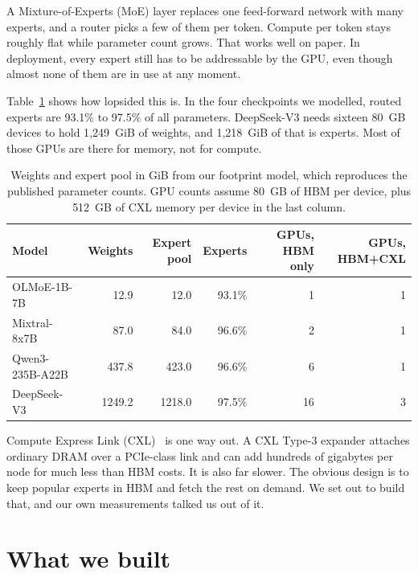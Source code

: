 \documentclass[10pt,a4paper]{article}
\begin{document}
A Mixture-of-Experts (MoE) layer replaces one feed-forward network with many
experts, and a router picks a few of them per token. Compute per token stays
roughly flat while parameter count grows. That works well on paper. In deployment,
every expert still has to be addressable by the GPU, even though almost none of
them are in use at any moment.

Table~\ref{tab:footprint} shows how lopsided this is. In the four checkpoints we
modelled, routed experts are 93.1\% to 97.5\% of all parameters. DeepSeek-V3 needs
sixteen 80~GB devices to hold 1{,}249~GiB of weights, and 1{,}218~GiB of that is
experts. Most of those GPUs are there for memory, not for compute.

\begin{table}[htbp]
\centering\small
\caption{Weights and expert pool in GiB from our footprint model, which
reproduces the published parameter counts. GPU counts assume 80~GB of HBM per
device, plus 512~GB of CXL memory per device in the last column.}
\label{tab:footprint}
\begin{tabular}{lrrrrr}
\toprule
Model & Weights & Expert pool & Experts & GPUs, HBM only & GPUs, HBM+CXL \\
\midrule
OLMoE-1B-7B~\cite{olmoe}       & 12.9   & 12.0   & 93.1\% & 1  & 1 \\
Mixtral-8x7B~\cite{mixtral}    & 87.0   & 84.0   & 96.6\% & 2  & 1 \\
Qwen3-235B-A22B~\cite{qwen3}   & 437.8  & 423.0  & 96.6\% & 6  & 1 \\
DeepSeek-V3~\cite{dsv3}        & 1249.2 & 1218.0 & 97.5\% & 16 & 3 \\
\bottomrule
\end{tabular}
\end{table}

Compute Express Link (CXL)~\cite{cxl} is one way out. A CXL Type-3 expander
attaches ordinary DRAM over a PCIe-class link and can add hundreds of gigabytes
per node for much less than HBM costs. It is also far slower. The obvious design
is to keep popular experts in HBM and fetch the rest on demand. We set out to
build that, and our own measurements talked us out of it.

\section{What we built}
\end{document}
